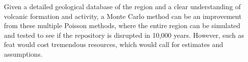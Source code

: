 \documentclass[12pt]{article}
\begin{document}
Given a detailed geological database of the region and a clear understanding
of volcanic formation and activity, a Monte Carlo method can be an 
improvement from these multiple Poisson methods, where the entire
region can be simulated and tested to see if the repository is disrupted
in 10,000 years. However, such as feat would cost tremendous resources,
which would call for estimates and assumptions.  


\FloatBarrier


\pagebreak





\end{document}
